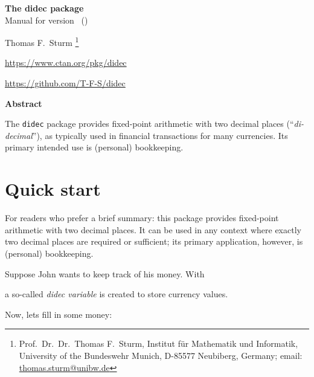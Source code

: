 \documentclass[a4paper,11pt]{ltxdoc}
\begin{document}
\begin{center}
\begin{tcolorbox}[enhanced,hbox,tikznode,left=8mm,right=8mm,boxrule=0.4pt,
  colback=white,colframe=Blue_Gray,
  drop lifted shadow=Blue_Gray!50,arc is angular,
  before=\par\vspace*{5mm},after=\par\bigskip]
{\bfseries\LARGE The didec package}\\[3mm]
{\large Manual for version \version\ (\datum)}
\end{tcolorbox}
{\large Thomas F.~Sturm%
  \footnote{Prof.~Dr.~Dr.~Thomas F.~Sturm, Institut f\"{u}r Mathematik und Informatik,
    University of the Bundeswehr Munich, D-85577 Neubiberg, Germany;
     email: \href{mailto:thomas.sturm@unibw.de}{thomas.sturm@unibw.de}}\par\medskip
\normalsize%
\url{https://www.ctan.org/pkg/didec}\par
\url{https://github.com/T-F-S/didec}
}
\end{center}
\bigskip
\begin{absquote}
  \begin{center}\bfseries Abstract\end{center}
  The \texttt{didec} package provides fixed-point arithmetic with two decimal places
  \mbox{(\enquote{\itshape di-decimal})}, as typically used in financial transactions for many currencies.
  Its primary intended use is (personal) bookkeeping.
\end{absquote}

\tableofcontents

\clearpage
\section{Quick start}%
For readers who prefer a brief summary: this package provides fixed-point
arithmetic with two decimal places. It can be used in any context where exactly
two decimal places are required or sufficient; its primary application, however,
is (personal) bookkeeping.

Suppose John wants to keep track of his money. With
\begin{dispListing}
\end{dispListing}
a so-called \emph{didec variable} is created to store currency values.

Now, lets fill in some money:
\begin{dispListing}
\end{dispListing}
\end{document}
